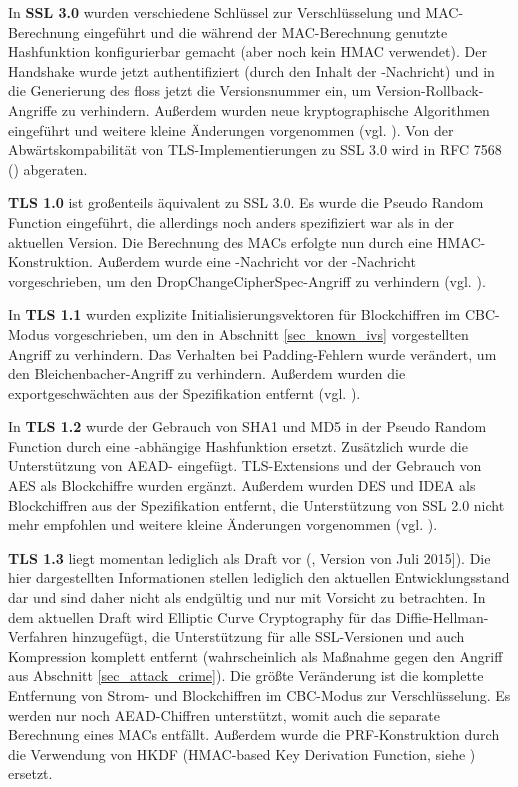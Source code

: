 In \textbf{SSL 3.0} wurden verschiedene Schlüssel zur Verschlüsselung und MAC-Berechnung eingeführt und die während der MAC-Berechnung genutzte Hashfunktion konfigurierbar gemacht (aber noch kein HMAC verwendet). Der Handshake wurde jetzt authentifiziert (durch den Inhalt der \finished{}-Nachricht) und in die Generierung des \premastersecret{} floss jetzt die Versionsnummer ein, um Version-Rollback-Angriffe zu verhindern. Außerdem wurden neue kryptographische Algorithmen eingeführt und weitere kleine Änderungen vorgenommen (vgl. \cite{ssl30}). Von der Abwärtskompabilität von TLS-Implementierungen zu SSL 3.0 wird in RFC 7568 (\cite{deprecate_ssl30}) abgeraten.

\textbf{TLS 1.0} ist großenteils äquivalent zu SSL 3.0. Es wurde die Pseudo Random Function eingeführt, die allerdings noch anders spezifiziert war als in der aktuellen Version. Die Berechnung des MACs erfolgte nun durch eine HMAC-Konstruktion. Außerdem wurde eine \changecipherspec{}-Nachricht vor der \finished{}-Nachricht vorgeschrieben, um den DropChangeCipherSpec-Angriff zu verhindern (vgl. \cite{tls10}).

In \textbf{TLS 1.1} wurden explizite Initialisierungsvektoren für Blockchiffren im CBC-Modus vorgeschrieben, um den in Abschnitt \ref{sec_known_ivs} vorgestellten Angriff zu verhindern. Das Verhalten bei Padding-Fehlern wurde verändert, um den Bleichenbacher-Angriff zu verhindern. Außerdem wurden die exportgeschwächten \ciphersuites{} aus der Spezifikation entfernt (vgl. \cite{tls11}).

In \textbf{TLS 1.2} wurde der Gebrauch von SHA1 und MD5 in der Pseudo Random Function durch eine \ciphersuite{}-abhängige Hashfunktion ersetzt. Zusätzlich wurde die Unterstützung von AEAD-\ciphersuites{} eingefügt. TLS-Extensions und der Gebrauch von AES als Blockchiffre wurden ergänzt. Außerdem wurden DES und IDEA als Blockchiffren aus der Spezifikation entfernt, die Unterstützung von SSL 2.0 nicht mehr empfohlen und weitere kleine Änderungen vorgenommen (vgl. \cite{tls12}).

\textbf{TLS 1.3} liegt momentan lediglich als Draft vor (\cite{tls13}, Version von Juli 2015]). Die hier dargestellten Informationen stellen lediglich den aktuellen Entwicklungsstand dar und sind daher nicht als endgültig und nur mit Vorsicht zu betrachten. In dem aktuellen Draft wird  Elliptic Curve Cryptography für das Diffie-Hellman-Verfahren hinzugefügt, die Unterstützung für alle SSL-Versionen und auch Kompression komplett entfernt (wahrscheinlich als Maßnahme gegen den Angriff aus Abschnitt \ref{sec_attack_crime}). Die größte Veränderung ist die komplette Entfernung von Strom- und Blockchiffren im CBC-Modus zur Verschlüsselung. Es werden nur noch AEAD-Chiffren unterstützt, womit auch die separate Berechnung eines MACs entfällt. Außerdem wurde die PRF-Konstruktion durch die Verwendung von HKDF (HMAC-based Key Derivation Function, siehe \cite{krawczyk10}) ersetzt.

